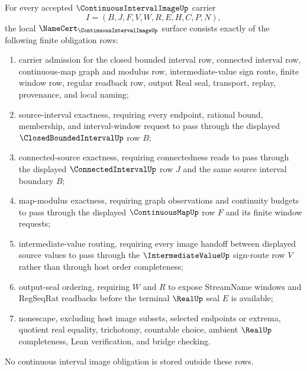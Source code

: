 \begin{theorem}
\label{thm:continuous-interval-image-namecert-obligations}
For every accepted $\ContinuousIntervalImageUp$ carrier
$$
I=(B,J,F,V,W,R,E,H,C,P,N),
$$
the local $\NameCert_{\ContinuousIntervalImageUp}$ surface consists exactly of the following finite obligation rows:
\begin{enumerate}
\item carrier admission for the closed bounded interval row, connected interval row, continuous-map graph and modulus row, intermediate-value sign route, finite window row, regular readback row, output Real seal, transport, replay, provenance, and local naming;
\item source-interval exactness, requiring every endpoint, rational bound, membership, and interval-window request to pass through the displayed $\ClosedBoundedIntervalUp$ row $B$;
\item connected-source exactness, requiring connectedness reads to pass through the displayed $\ConnectedIntervalUp$ row $J$ and the same source interval boundary $B$;
\item map-modulus exactness, requiring graph observations and continuity budgets to pass through the displayed $\ContinuousMapUp$ row $F$ and its finite window requests;
\item intermediate-value routing, requiring every image handoff between displayed source values to pass through the $\IntermediateValueUp$ sign-route row $V$ rather than through host order completeness;
\item output-seal ordering, requiring $W$ and $R$ to expose StreamName windows and RegSeqRat readbacks before the terminal $\RealUp$ seal $E$ is available;
\item nonescape, excluding host image subsets, selected endpoints or extrema, quotient real equality, trichotomy, countable choice, ambient $\RealUp$ completeness, Lean verification, and bridge checking.
\end{enumerate}
No continuous interval image obligation is stored outside these rows.
\end{theorem}
